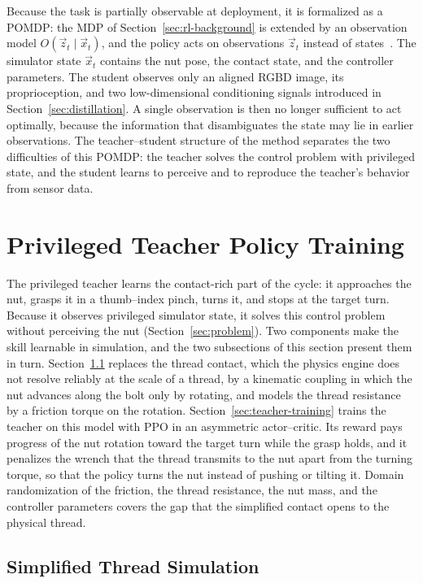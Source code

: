 Because the task is partially observable at deployment, it is formalized as a \ac{POMDP}: the \ac{MDP} of Section~\ref{sec:rl-background} is extended by an observation model $O(\vec{z}_t\mid\vec{x}_t)$, and the policy acts on observations $\vec{z}_t$ instead of states~\cite{Sutton2018}. The simulator state $\vec{x}_t$ contains the nut pose, the contact state, and the controller parameters. The student observes only an aligned \acs{RGBD} image, its proprioception, and two low-dimensional conditioning signals introduced in Section~\ref{sec:distillation}. A single observation is then no longer sufficient to act optimally, because the information that disambiguates the state may lie in earlier observations. The teacher--student structure of the method separates the two difficulties of this \ac{POMDP}: the teacher solves the control problem with privileged state, and the student learns to perceive and to reproduce the teacher's behavior from sensor data.

\section{Privileged Teacher Policy Training}\label{sec:teacher}

The privileged teacher learns the contact-rich part of the cycle: it approaches the nut, grasps it in a thumb--index pinch, turns it, and stops at the target turn. Because it observes privileged simulator state, it solves this control problem without perceiving the nut (Section~\ref{sec:problem}). Two components make the skill learnable in simulation, and the two subsections of this section present them in turn. Section~\ref{sec:thread-model} replaces the thread contact, which the physics engine does not resolve reliably at the scale of a thread, by a kinematic coupling in which the nut advances along the bolt only by rotating, and models the thread resistance by a friction torque on the rotation. Section~\ref{sec:teacher-training} trains the teacher on this model with \ac{PPO} in an asymmetric actor--critic. Its reward pays progress of the nut rotation toward the target turn while the grasp holds, and it penalizes the wrench that the thread transmits to the nut apart from the turning torque, so that the policy turns the nut instead of pushing or tilting it. Domain randomization of the friction, the thread resistance, the nut mass, and the controller parameters covers the gap that the simplified contact opens to the physical thread.

\subsection{Simplified Thread Simulation}\label{sec:thread-model}

